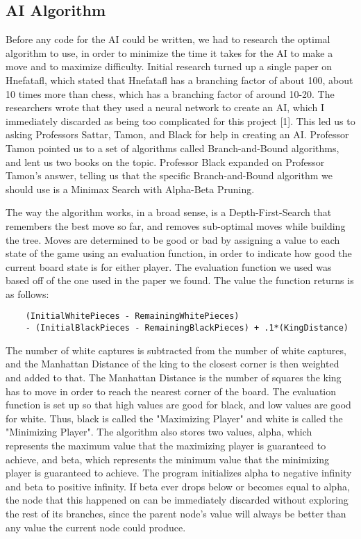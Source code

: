 \documentclass{article}
\begin{document}
\subsection{AI Algorithm}
	Before any code for the AI could be written, we had to research the optimal algorithm to use, in order to minimize the time it takes for the AI to make a move and to maximize difficulty. Initial research turned up a single paper on Hnefatafl, which stated that Hnefatafl has a branching factor of about 100, about 10 times more than chess, which has a branching factor of around 10-20. The researchers wrote that they used a neural network to create an AI, which I immediately discarded as being too complicated for this project [1]. This led us to asking Professors Sattar, Tamon, and Black for help in creating an AI. Professor Tamon pointed us to a set of algorithms called Branch-and-Bound algorithms, and lent us two books on the topic. Professor Black expanded on Professor Tamon's answer, telling us that the specific Branch-and-Bound algorithm we should use is a Minimax Search with Alpha-Beta Pruning. \par
	The way the algorithm works, in a broad sense, is a Depth-First-Search that remembers the best move so far, and removes sub-optimal moves while building the tree. Moves are determined to be good or bad by assigning a value to each state of the game using an evaluation function, in order to indicate how good the current board state is for either player. The evaluation function we used was based off of the one used in the paper we found. The value the function returns is as follows:
\begin{lstlisting}
	(InitialWhitePieces - RemainingWhitePieces) 	
	- (InitialBlackPieces - RemainingBlackPieces) + .1*(KingDistance)
\end{lstlisting}
The number of white captures is subtracted from the number of white captures, and the Manhattan Distance of the king to the closest corner is then weighted and added to that. The Manhattan Distance is the number of squares the king has to move in order to reach the nearest corner of the board. The evaluation function is set up so that high values are good for black, and low values are good for white. Thus, black is called the "Maximizing Player" and white is called the "Minimizing Player". The algorithm also stores two values, alpha, which represents the maximum value that the maximizing player is guaranteed to achieve, and beta, which represents the minimum value that the minimizing player is guaranteed to achieve. The program initializes alpha to negative infinity and beta to positive infinity. If beta ever drops below or becomes equal to alpha, the node that this happened on can be immediately discarded without exploring the rest of its branches, since the parent node's value will always be better than any value the current node could produce. \par
\end{document}
